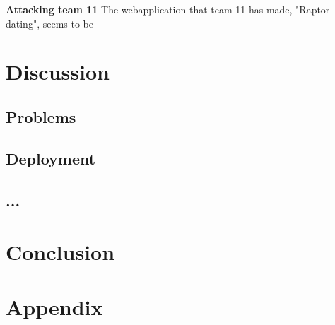 \documentclass[a4paper]{article}
\begin{document}
\textbf{Attacking team 11}
The webapplication that team 11 has made, "Raptor dating", seems to be





\section{Discussion}
\subsection{Problems}
\subsection{Deployment}

\subsection{...}


\section{Conclusion}

\newpage
\section{Appendix}
\end{document}
